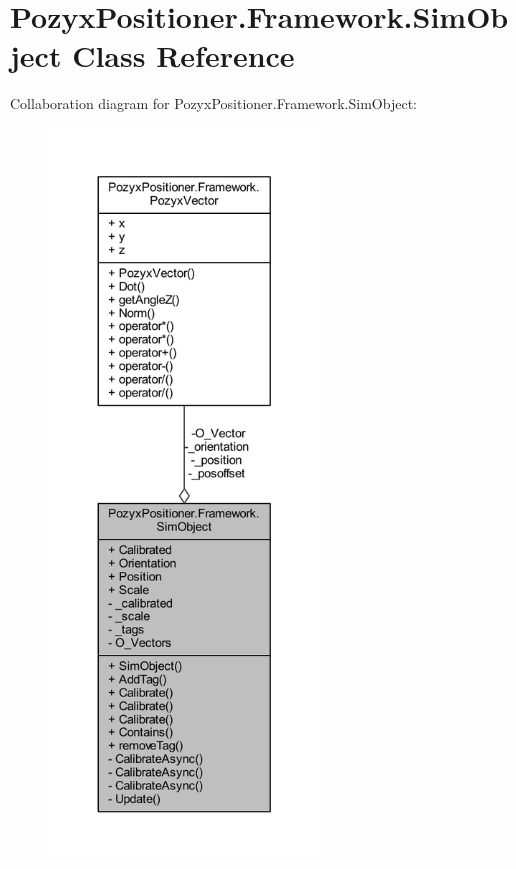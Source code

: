\hypertarget{class_pozyx_positioner_1_1_framework_1_1_sim_object}{}\section{Pozyx\+Positioner.\+Framework.\+Sim\+Object Class Reference}
\label{class_pozyx_positioner_1_1_framework_1_1_sim_object}


Collaboration diagram for Pozyx\+Positioner.\+Framework.\+Sim\+Object\+:\nopagebreak
\begin{figure}[H]
\begin{center}
\leavevmode
\includegraphics[height=550pt]{class_pozyx_positioner_1_1_framework_1_1_sim_object__coll__graph}
\end{center}
\end{figure}
